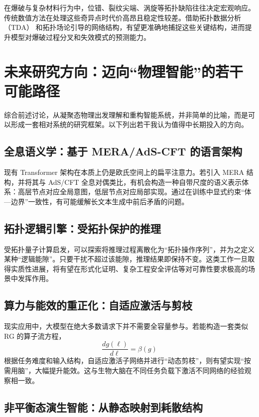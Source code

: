 \documentclass[12pt,a4paper]{article}
\begin{document}
在爆破与复杂材料行为中，位错、裂纹尖端、涡旋等拓扑缺陷往往决定宏观响应。传统数值方法在处理这些奇异点时代价高昂且稳定性较差。借助拓扑数据分析（TDA）\cite{carlsson2009topology} 和拓扑场论引导的网络结构，有望更准确地捕捉这些关键结构，进而提升模型对爆破过程分叉和失效模式的预测能力。

\section{未来研究方向：迈向“物理智能”的若干可能路径}

综合前述讨论，从凝聚态物理出发理解和重构智能系统，并非简单的比喻，而是可以形成一套相对系统的研究框架。以下列出若干我认为值得中长期投入的方向。

\subsection{全息语义学：基于 MERA/AdS-CFT 的语言架构}

现有 Transformer 架构在本质上仍是欧氏空间上的扁平注意力。若引入 MERA 结构\cite{vidal2008class}，并将其与 AdS/CFT 全息对偶类比，有机会构造一种自带尺度的语义表示体系：高层节点对应全局意图，低层节点对应局部实现。通过在训练中显式约束“体—边界”一致性，有可能缓解长文本生成中前后矛盾的问题。

\subsection{拓扑逻辑引擎：受拓扑保护的推理}

受拓扑量子计算启发，可以探索将推理过程离散化为“拓扑操作序列”，并为之定义某种“逻辑能隙”。只要干扰不超过该能隙，推理结果即保持不变。这类工作一旦取得实质性进展，将有望在形式化证明、复杂工程安全评估等对可靠性要求极高的场景中发挥作用。

\subsection{算力与能效的重正化：自适应激活与剪枝}

现实应用中，大模型在绝大多数请求下并不需要全容量参与。若能构造一套类似 RG 的算子流方程，
\begin{equation}
    \frac{d g(\ell)}{d \ell} = \beta(g)
\end{equation}
根据任务难度和输入结构，自适应激活子网络并进行“动态剪枝”，则有望实现“按需用脑”，大幅提升能效。这与生物大脑在不同任务负载下激活不同网络的经验观察相一致。

\subsection{非平衡态演生智能：从静态映射到耗散结构}
\end{document}
